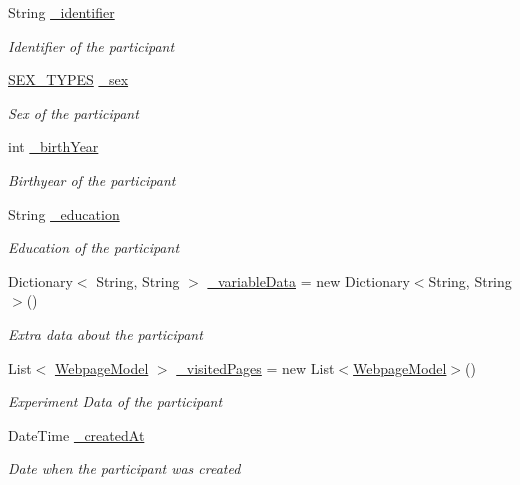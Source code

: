 \begin{DoxyCompactItemize}
\item 
String \hyperlink{class_web_analyzer_1_1_models_1_1_base_1_1_experiment_participant_a78f7ef6a042a9c3b2b35618931706ee6}{\+\_\+identifier}
\begin{DoxyCompactList}\small\item\em Identifier of the participant \end{DoxyCompactList}\item 
\hyperlink{class_web_analyzer_1_1_models_1_1_base_1_1_experiment_participant_a38a0a0bc1d3ad083204da1de1fb93754}{S\+E\+X\+\_\+\+T\+Y\+P\+E\+S} \hyperlink{class_web_analyzer_1_1_models_1_1_base_1_1_experiment_participant_a429b36341a5a5c2a52e50c5f96afa69d}{\+\_\+sex}
\begin{DoxyCompactList}\small\item\em Sex of the participant \end{DoxyCompactList}\item 
int \hyperlink{class_web_analyzer_1_1_models_1_1_base_1_1_experiment_participant_a427f4aec241735ad90e082b285dc4a6b}{\+\_\+birth\+Year}
\begin{DoxyCompactList}\small\item\em Birthyear of the participant \end{DoxyCompactList}\item 
String \hyperlink{class_web_analyzer_1_1_models_1_1_base_1_1_experiment_participant_ad23c640c3cbaef32fff1f457dd1f6031}{\+\_\+education}
\begin{DoxyCompactList}\small\item\em Education of the participant \end{DoxyCompactList}\item 
Dictionary$<$ String, String $>$ \hyperlink{class_web_analyzer_1_1_models_1_1_base_1_1_experiment_participant_a2672843dcbe74068d5654320285c3dae}{\+\_\+variable\+Data} = new Dictionary$<$String, String$>$()
\begin{DoxyCompactList}\small\item\em Extra data about the participant \end{DoxyCompactList}\item 
List$<$ \hyperlink{class_web_analyzer_1_1_models_1_1_data_model_1_1_webpage_model}{Webpage\+Model} $>$ \hyperlink{class_web_analyzer_1_1_models_1_1_base_1_1_experiment_participant_a8aae8ea941b9ae583c9747d70fe31469}{\+\_\+visited\+Pages} = new List$<$\hyperlink{class_web_analyzer_1_1_models_1_1_data_model_1_1_webpage_model}{Webpage\+Model}$>$()
\begin{DoxyCompactList}\small\item\em Experiment Data of the participant \end{DoxyCompactList}\item 
Date\+Time \hyperlink{class_web_analyzer_1_1_models_1_1_base_1_1_experiment_participant_a8c3c2f0bc432f0ae40d375246b8cb7c2}{\+\_\+created\+At}
\begin{DoxyCompactList}\small\item\em Date when the participant was created \end{DoxyCompactList}\end{DoxyCompactItemize}


